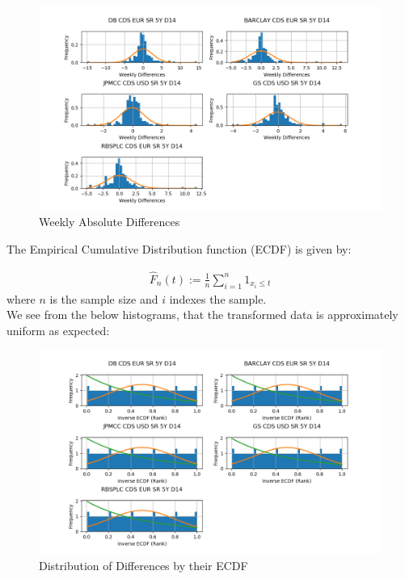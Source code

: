 \documentclass{report}
\theoremstyle{plain}
\theoremstyle{definition}
\begin{document}
\begin{figure}[H]
	\begin{center}
		\includegraphics[width=15cm]{Weekly_absolute_diffs.png}
		\caption{Weekly Absolute Differences} 
		\label{Weekly_absolute_diffs}
	\end{center}
\end{figure}

The Empirical Cumulative Distribution function (ECDF) is given by:

\begin{align*}
\hat{F}_n(t) := \frac{1}{n}\sum_{i=1}^{n}1_{x_i \leq t}
\end{align*}
where $n$ is the sample size and $i$ indexes the sample.\\

We see from the below histograms, that the transformed data is approximately uniform as expected:

\begin{figure}[H]
	\begin{center}
		\includegraphics[width=15cm]{Inverse_ECDF_Rank.png}
		\caption{Distribution of Differences by their ECDF} 
		\label{Inverse_ECDF_Rank}
	\end{center}
\end{figure}
\end{document}
